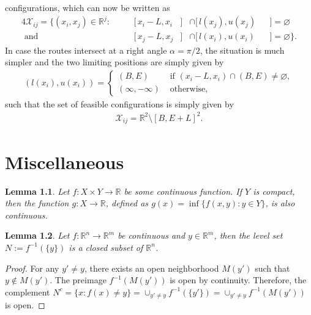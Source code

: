 \documentclass[a4paper]{report}
\theoremstyle{definition}
\theoremstyle{plain}
\newtheorem{lemma}{Lemma}[chapter]
\begin{document}
configurations, which can now be written as
\begin{alignat}{4}
  \mathcal{X}_{ij} = \{ (x_{i}, x_{j}) \in \mathbb{R}^{j} :& \; &&[\,x_{i} - L,x_{i} &]& \cap [\,l(x_{j}), u(x_{j}) &&] = \varnothing \\
  \text{ and } & \, &&[\,x_{j} - L, x_{j} &]& \cap [\,l(x_{i}), u(x_{i}) &&] = \varnothing \} .
\end{alignat}
%
In case the routes intersect at a right angle $\alpha = \pi / 2$, the situation
is much simpler and the two limiting positions are simply given by
\begin{align}
  (l(x_{i}), u(x_{i})) =
  \begin{cases}
    (B,  E)    &\text{ if } (x_{i} - L, x_{i}) \cap (B, E) \neq \varnothing , \\
    (\infty, -\infty) &\text{ otherwise, }
  \end{cases}
\end{align}
such that the set of feasible configurations is simply given by
\begin{align}
  \mathcal{X}_{ij} = \mathbb{R}^{2} \setminus [B,E + L]^{2} .
\end{align}

\chapter{Miscellaneous}

\begin{lemma}\label{lemma:inf-continuous}
  Let $f : X \times Y \rightarrow \mathbb{R}$ be some continuous function. If
  $Y$ is compact, then the function $g : X \rightarrow \mathbb{R}$, defined as
  $g(x) = \inf \{ f(x,y) : y\in Y\}$, is also continuous.
\end{lemma}

\begin{lemma}\label{lemma:levelset}
  Let $f :\mathbb{R}^{n} \rightarrow \mathbb{R}^{m}$ be continuous and
  $y \in \mathbb{R}^{m}$, then the level set $N := f^{-1}(\{ y \})$ is a closed
  subset of $\mathbb{R}^{n}$.
\end{lemma}
\begin{proof}
  For any $y' \neq y$, there exists an open neighborhood $M(y')$ such that
  $y \notin M(y')$. The preimage $f^{-1}(M(y'))$ is open by continuity.
  Therefore, the complement
  $N^{c} = \{ x : f(x) \neq y \} = \cup_{y' \neq y} f^{-1}(\{y'\}) = \cup_{y' \neq y} f^{-1}(M(y'))$
  is open.
\end{proof}
\end{document}
